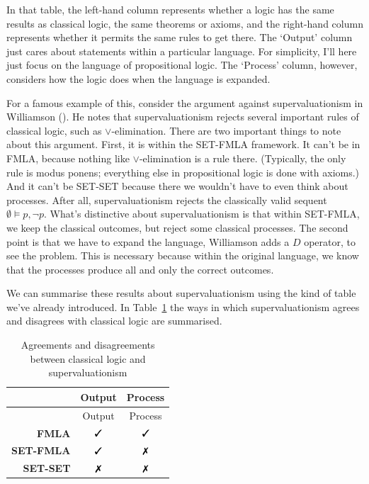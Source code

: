 \documentclass[
  11pt,
  letterpaper,
  DIV=11,
  numbers=noendperiod,
  twoside]{scrartcl}
\newcommand{\tick}{\text{\ding{51}}}
\newcommand{\cross}{\text{\ding{55}}}
\begin{document}
In that table, the left-hand column represents whether a logic has the
same results as classical logic, the same theorems or axioms, and the
right-hand column represents whether it permits the same rules to get
there. The `Output' column just cares about statements within a
particular language. For simplicity, I'll here just focus on the
language of propositional logic. The `Process' column, however,
considers how the logic does when the language is expanded.

For a famous example of this, consider the argument against
supervaluationism in Williamson ().
He notes that supervaluationism rejects several important rules of
classical logic, such as \(\vee\)-elimination. There are two important
things to note about this argument. First, it is within the SET-FMLA
framework. It can't be in FMLA, because nothing like
\(\vee\)-elimination is a rule there. (Typically, the only rule is modus
ponens; everything else in propositional logic is done with axioms.) And
it can't be SET-SET because there we wouldn't have to even think about
processes. After all, supervaluationism rejects the classically valid
sequent \(\emptyset \vDash p, \neg p\). What's distinctive about
supervaluationism is that within SET-FMLA, we keep the classical
outcomes, but reject some classical processes. The second point is that
we have to expand the language, Williamson adds a \(D\) operator, to see
the problem. This is necessary because within the original language, we
know that the processes produce all and only the correct outcomes.

We can summarise these results about supervaluationism using the kind of
table we've already introduced. In Table~\ref{tbl-sv} the ways in which
supervaluationism agrees and disagrees with classical logic are
summarised.

\begin{longtable}[]{@{}rcc@{}}
\caption{Agreements and disagreements between classical logic and
supervaluationism}\label{tbl-sv}\tabularnewline
\toprule\noalign{}
& Output & Process \\
\midrule\noalign{}
\endfirsthead
\toprule\noalign{}
& Output & Process \\
\midrule\noalign{}
\endhead
\bottomrule\noalign{}
\endlastfoot
\textbf{FMLA} & \(\tick\) & \(\tick\) \\
\textbf{SET-FMLA} & \(\tick\) & \(\cross\) \\
\textbf{SET-SET} & \(\cross\) & \(\cross\) \\
\end{longtable}
\end{document}
